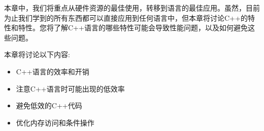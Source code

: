 本章中，我们将重点从硬件资源的最佳使用，转移到语言的最佳应用。虽然，目前为止我们学到的所有东西都可以直接应用到任何语言中，但本章将讨论C++的特性和特性。您将了解C++语言的哪些特性可能会导致性能问题，以及如何避免这些问题。 

本章将讨论以下内容:

\begin{itemize}
\item
C++语言的效率和开销

\item
注意C++语言时可能出现的低效率

\item
避免低效的C++代码

\item
优化内存访问和条件操作
	
\end{itemize}